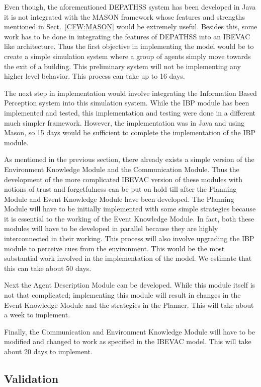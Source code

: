 Even though, the aforementioned DEPATHSS system has been developed in Java it is not integrated with the MASON framework whose features and strengths mentioned in Sect.~\ref{CFW:MASON} would be extremely useful. Besides this, some work has to be done in integrating the features of DEPATHSS into an IBEVAC like architecture. Thus the first objective in implementing the model would be to create a simple simulation system where a group of agents simply move towards the exit of a building. This preliminary system will not be implementing any higher level behavior. This process can take up to 16 days.

The next step in implementation would involve integrating the Information Based Perception system into this simulation system. While the IBP module has been implemented and tested, this implementation and testing were done in a different much simpler framework. However, the implementation was in Java and using Mason, so 15 days would be sufficient to complete the implementation of the IBP module.


As mentioned in the previous section, there already exists a simple version of the Environment Knowledge Module and the Communication Module. Thus the development of the more complicated IBEVAC version of these modules with notions of trust and forgetfulness can be put on hold till after the Planning Module and Event Knowledge Module have been developed. The Planning Module will have to be initially implemented with some simple strategies because it is essential to the working of the Event Knowledge Module. In fact, both these modules will have to be developed in parallel because they are highly interconnected in their working. This process will also involve upgrading the IBP module to perceive cues from the environment. This would be the most substantial work involved in the implementation of the model. We estimate that this can take about 50 days.

Next the Agent Description Module can be developed. While this module itself is not that complicated; implementing this module will result in changes in the Event Knowledge Module and the strategies in the Planner. This will take about a week to implement.

Finally, the Communication and Environment Knowledge Module will have to be modified and changed to work as specified in the IBEVAC model. This will take about 20 days to implement.

\subsection{Validation}
\label{CFW:Validation}

